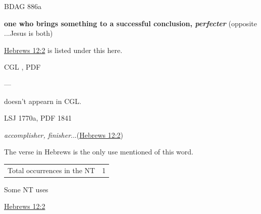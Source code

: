 				\begin{compactdesc}
					\item[BDAG 886a] \textbf{}
						\begin{compactitem}
							\item \textbf{one who brings something to a successful conclusion, \textit{perfecter}} (opposite ...Jesus is both)
								\begin{compactitem}
									\item \hyperref[HEBREWS-12-2]{Hebrews 12:2} is listed under this here.
								\end{compactitem}
						\end{compactitem}
					\item[CGL , PDF ] \textbf{}
						\begin{compactitem}
							\item ---
								\begin{compactitem}
									\item \gr{τελειωτής} doesn't appearn in CGL.
								\end{compactitem}
						\end{compactitem}
					\item[LSJ 1770a, PDF 1841] \textbf{}
						\begin{compactitem}
							\item \textit{accomplisher, finisher}...(\hyperref[HEBREWS-12-2]{Hebrews 12:2})
								\begin{compactitem}
									\item The verse in Hebrews is the only use mentioned of this word.
								\end{compactitem}
						\end{compactitem}
				\end{compactdesc}
				
				\begin{tabular}{ll}
					Total occurrences in the NT & 1
				\end{tabular}
				
				\begin{compactdesc}
					\item[Some NT uses] \textbf{}
						\begin{compactdesc}
							\item[{\hyperref[HEBREWS-12-2]{Hebrews 12:2}}]
						\end{compactdesc}
				\end{compactdesc}
		
	
